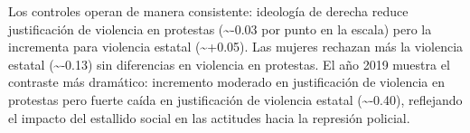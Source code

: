 \documentclass[
  13pt,
]{article}
\begin{document}
Los controles operan de manera consistente: ideología de derecha reduce
justificación de violencia en protestas (\textasciitilde-0.03 por punto
en la escala) pero la incrementa para violencia estatal
(\textasciitilde+0.05). Las mujeres rechazan más la violencia estatal
(\textasciitilde-0.13) sin diferencias en violencia en protestas. El año
2019 muestra el contraste más dramático: incremento moderado en
justificación de violencia en protestas pero fuerte caída en
justificación de violencia estatal (\textasciitilde-0.40), reflejando el
impacto del estallido social en las actitudes hacia la represión
policial.

\begin{table}

\caption{\label{tbl-modelos-interaccion}Modelos de interacción para
justificación de violencia}

\centering{

}
\end{table}
\end{document}

